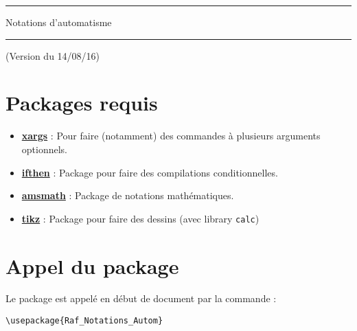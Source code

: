 \documentclass[a4paper,10pt]{article}
\newcommand{\rac}{({\color{red}Raccourci})}
\newcommand{\ren}{({\color{blue}Renommé})}
\begin{document}
	\begin{center}
		\hrule{\Large Notations d'automatisme}\\\hrule
	\end{center}
	(Version du 14/08/16)

	\section{Packages requis}

		\begin{itemize}
			\item \href{https://www.ctan.org/pkg/xargs}{\textbf{xargs}} : Pour faire (notamment) des commandes à plusieurs arguments optionnels.
			\item \href{https://www.ctan.org/pkg/ifthen}{\textbf{ifthen}} : Package pour faire des compilations conditionnelles.
			\item \href{http://www.ams.org/publications/authors/tex/amslatex}{\textbf{amsmath}} : Package de notations mathématiques.
			\item \href{http://www.ctan.org/pkg/pgf}{\textbf{tikz}} : Package pour faire des dessins (avec library \verb!calc!)
		\end{itemize}

	\section{Appel du package}

		Le package est appelé en début de document par la commande :
		\begin{verbatim}
\usepackage{Raf_Notations_Autom}
		\end{verbatim}

		
		
% 
\end{document}
